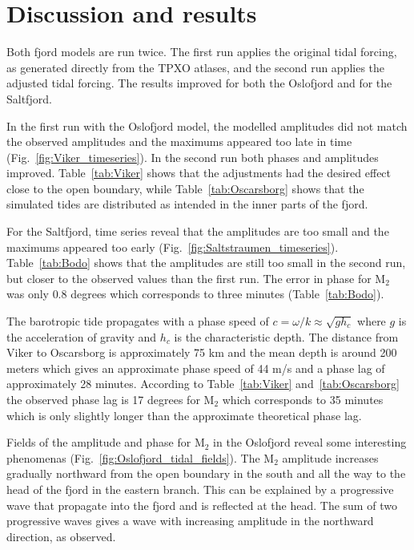 \section{Discussion and results}

Both fjord models are run twice. The first run applies the original tidal forcing, as generated directly from the TPXO atlases, and the second run applies the adjusted tidal forcing. The results improved for both the Oslofjord and for the Saltfjord. 

In the first run with the Oslofjord model, the modelled amplitudes did not match the observed amplitudes and the maximums appeared too late in time (Fig.~\ref{fig:Viker_timeseries}). In the second run both phases and amplitudes improved. Table~\ref{tab:Viker} shows that the adjustments had the desired effect close to the open boundary, while Table~\ref{tab:Oscarsborg} shows that the simulated tides are distributed as intended in the inner parts of the fjord. 

For the Saltfjord, time series reveal that the amplitudes are too small and the maximums appeared too early (Fig.~\ref{fig:Saltstraumen_timeseries}). Table~\ref{tab:Bodo} shows that the amplitudes are still too small in the second run, but closer to the observed values than the first run. The error in phase for M$_2$ was only $0.8$ degrees which corresponds to three minutes (Table~\ref{tab:Bodo}).

The barotropic tide propagates with a phase speed of $c = \omega/k \approx \sqrt{g h_c}$ where $g$ is the acceleration of gravity and $h_c$ is the characteristic depth. The distance from Viker to Oscarsborg is approximately 75 km and the mean depth is around 200 meters which gives an approximate phase speed of 44 m/s and a phase lag of approximately 28 minutes. According to Table~\ref{tab:Viker} and~\ref{tab:Oscarsborg} the observed phase lag is 17 degrees for M$_2$ which corresponds to 35 minutes which is only slightly longer than the approximate theoretical phase lag. 

Fields of the amplitude and phase for M$_2$ in the Oslofjord reveal some interesting phenomenas (Fig.~\ref{fig:Oslofjord_tidal_fields}). 
The M$_2$ amplitude increases gradually northward from the open boundary in the south and all the way to the head of the fjord in the eastern branch. 
This can be explained by a progressive wave that propagate into the fjord and is reflected at the head.
The sum of two progressive waves gives a wave with increasing amplitude in the northward direction, as observed. 

